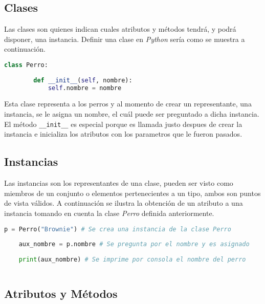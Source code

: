 \documentclass[11pt, letterpaper]{article}
\begin{document}
\subsection*{Clases}
Las clases son quienes indican cuales atributos y métodos tendrá, y podrá disponer, una instancia. Definir una clase en \textit{Python} sería como se muestra a continuación.

\begin{center}
\begin{lstlisting}[language=Python,frame=single]
    class Perro:
        
        def __init__(self, nombre):
            self.nombre = nombre
\end{lstlisting}
\end{center}

Esta clase representa a los perros y al momento de crear un representante, una instancia, se le asigna un nombre, el cuál puede ser preguntado a dicha instancia. El método \texttt{\_\_init\_\_} es especial porque es llamada justo despues de crear la instancia e inicializa los atributos con los parametros que le fueron pasados.

\subsection*{Instancias}

Las instancias son los representantes de una clase, pueden ser visto como miembros de un conjunto o elementos pertenecientes a un tipo, ambos son puntos de vista válidos. A continuación se ilustra la obtención de un atributo a una instancia tomando en cuenta la clase \textit{Perro} definida anteriormente.

\begin{center}
\begin{lstlisting}[language=Python,frame=single]
    p = Perro("Brownie") # Se crea una instancia de la clase Perro
    
    aux_nombre = p.nombre # Se pregunta por el nombre y es asignado
    
    print(aux_nombre) # Se imprime por consola el nombre del perro
    
\end{lstlisting}
\end{center}

\subsection*{Atributos y Métodos}
\end{document}
